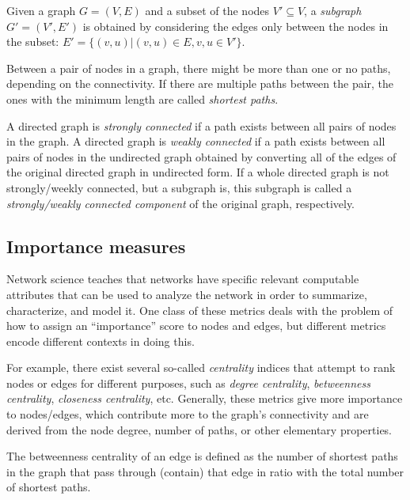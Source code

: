 \begin{definition}
Given a graph $G=(V, E)$ and a subset of the nodes $V' \subseteq V$, a \emph{subgraph} $G'=(V', E')$ is obtained by considering the edges only between the nodes in the subset: $E' = \{(v, u)|(v, u) \in E, v,u \in V'\}$.
\end{definition}

\begin{definition}
Between a pair of nodes in a graph, there might be more than one or no paths, depending on the connectivity. If there are multiple paths between the pair, the ones with the minimum length are called \emph{shortest paths}.
\end{definition}

\begin{definition}
A directed graph is \emph{strongly connected} if a path exists between all pairs of nodes in the graph. A directed graph is \emph{weakly connected} if a path exists between all pairs of nodes in the undirected graph obtained by converting all of the edges of the original directed graph in undirected form. If a whole directed graph is not strongly/weekly connected, but a subgraph is, this subgraph is called a \emph{strongly/weakly connected component} of the original graph, respectively.
\end{definition}

\subsection{Importance measures}

Network science teaches that networks have specific relevant computable attributes that can be used to analyze the network in order to summarize, characterize, and model it. One class of these metrics deals with the problem of how to assign an \enquote{importance} score to nodes and edges, but different metrics encode different contexts in doing this.

For example, there exist several so-called \emph{centrality} indices that attempt to rank nodes or edges for different purposes, such as \emph{degree centrality}, \emph{betweenness centrality}, \emph{closeness centrality}, etc. Generally, these metrics give more importance to nodes/edges, which contribute more to the graph's connectivity and are derived from the node degree, number of paths, or other elementary properties.

\begin{definition}
The betweenness centrality of an edge is defined as the number of shortest paths in the graph that pass through (contain) that edge in ratio with the total number of shortest paths.
\end{definition}


